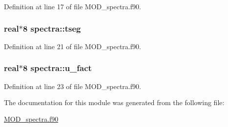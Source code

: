 Definition at line 17 of file M\-O\-D\-\_\-spectra.\-f90.

\hypertarget{classspectra_a1cd3434363a2e5083b4366b0295dd6b4}{
\subsubsection[{tseg}]{\setlength{\rightskip}{0pt plus 5cm}real$\ast$8 spectra\-::tseg}}\label{classspectra_a1cd3434363a2e5083b4366b0295dd6b4}


Definition at line 21 of file M\-O\-D\-\_\-spectra.\-f90.

\hypertarget{classspectra_a569f0a00a8335165b556f9d9a2199e5c}{
\subsubsection[{u\-\_\-fact}]{\setlength{\rightskip}{0pt plus 5cm}real$\ast$8 spectra\-::u\-\_\-fact}}\label{classspectra_a569f0a00a8335165b556f9d9a2199e5c}


Definition at line 23 of file M\-O\-D\-\_\-spectra.\-f90.



The documentation for this module was generated from the following file\-:\begin{DoxyCompactItemize}
\item 
\hyperlink{MOD__spectra_8f90}{M\-O\-D\-\_\-spectra.\-f90}\end{DoxyCompactItemize}
